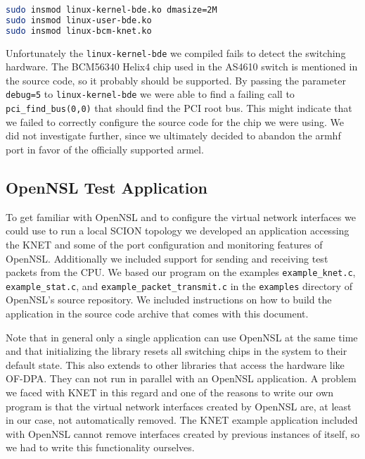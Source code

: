 \documentclass[a4paper]{article}
\begin{document}
\begin{lstlisting}[language=bash]
sudo insmod linux-kernel-bde.ko dmasize=2M
sudo insmod linux-user-bde.ko
sudo insmod linux-bcm-knet.ko
\end{lstlisting}

Unfortunately the \texttt{linux-kernel-bde} we compiled fails to detect the switching hardware. The BCM56340 Helix4 chip used in the AS4610 switch is mentioned in the source code, so it probably should be supported. By passing the parameter \texttt{debug=5} to \texttt{linux-kernel-bde} we were able to find a failing call to \texttt{pci\_find\_bus(0,0)} that should find the PCI root bus. This might indicate that we failed to correctly configure the source code for the chip we were using. We did not investigate further, since we ultimately decided to abandon the armhf port in favor of the officially supported armel.


\subsection{OpenNSL Test Application} \label{sec:opennsl_test_app}
To get familiar with OpenNSL and to configure the virtual network interfaces we could use to run a local SCION topology we developed an application accessing the KNET and some of the port configuration and monitoring features of OpenNSL. Additionally we included support for sending and receiving test packets from the CPU. We based our program on the examples \texttt{example\_knet.c}, \texttt{example\_stat.c}, and \texttt{example\_packet\_transmit.c} in the \texttt{examples} directory of OpenNSL's source repository. We included instructions on how to build the application in the source code archive that comes with this document.

Note that in general only a single application can use OpenNSL at the same time and that initializing the library resets all switching chips in the system to their default state. This also extends to other libraries that access the hardware like OF-DPA. They can not run in parallel with an OpenNSL application. A problem we faced with KNET in this regard and one of the reasons to write our own program is that the virtual network interfaces created by OpenNSL are, at least in our case, not automatically removed. The KNET example application included with OpenNSL cannot remove interfaces created by previous instances of itself, so we had to write this functionality ourselves.
\end{document}
